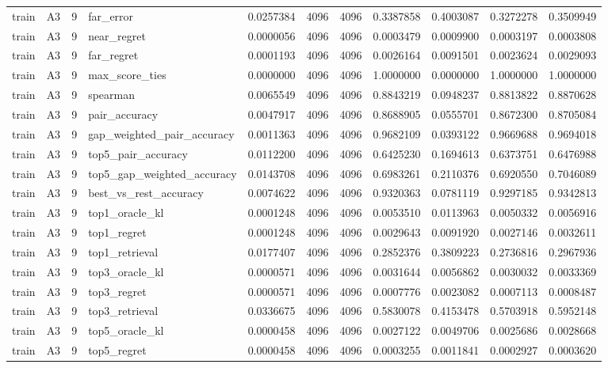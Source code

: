\begin{tabular}{llrlrrrrrrr}
train & A3 & 9 & far_error & 0.0257384 & 4096 & 4096 & 0.3387858 & 0.4003087 & 0.3272278 & 0.3509949 \\
train & A3 & 9 & near_regret & 0.0000056 & 4096 & 4096 & 0.0003479 & 0.0009900 & 0.0003197 & 0.0003808 \\
train & A3 & 9 & far_regret & 0.0001193 & 4096 & 4096 & 0.0026164 & 0.0091501 & 0.0023624 & 0.0029093 \\
train & A3 & 9 & max_score_ties & 0.0000000 & 4096 & 4096 & 1.0000000 & 0.0000000 & 1.0000000 & 1.0000000 \\
train & A3 & 9 & spearman & 0.0065549 & 4096 & 4096 & 0.8843219 & 0.0948237 & 0.8813822 & 0.8870628 \\
train & A3 & 9 & pair_accuracy & 0.0047917 & 4096 & 4096 & 0.8688905 & 0.0555701 & 0.8672300 & 0.8705084 \\
train & A3 & 9 & gap_weighted_pair_accuracy & 0.0011363 & 4096 & 4096 & 0.9682109 & 0.0393122 & 0.9669688 & 0.9694018 \\
train & A3 & 9 & top5_pair_accuracy & 0.0112200 & 4096 & 4096 & 0.6425230 & 0.1694613 & 0.6373751 & 0.6476988 \\
train & A3 & 9 & top5_gap_weighted_accuracy & 0.0143708 & 4096 & 4096 & 0.6983261 & 0.2110376 & 0.6920550 & 0.7046089 \\
train & A3 & 9 & best_vs_rest_accuracy & 0.0074622 & 4096 & 4096 & 0.9320363 & 0.0781119 & 0.9297185 & 0.9342813 \\
train & A3 & 9 & top1_oracle_kl & 0.0001248 & 4096 & 4096 & 0.0053510 & 0.0113963 & 0.0050332 & 0.0056916 \\
train & A3 & 9 & top1_regret & 0.0001248 & 4096 & 4096 & 0.0029643 & 0.0091920 & 0.0027146 & 0.0032611 \\
train & A3 & 9 & top1_retrieval & 0.0177407 & 4096 & 4096 & 0.2852376 & 0.3809223 & 0.2736816 & 0.2967936 \\
train & A3 & 9 & top3_oracle_kl & 0.0000571 & 4096 & 4096 & 0.0031644 & 0.0056862 & 0.0030032 & 0.0033369 \\
train & A3 & 9 & top3_regret & 0.0000571 & 4096 & 4096 & 0.0007776 & 0.0023082 & 0.0007113 & 0.0008487 \\
train & A3 & 9 & top3_retrieval & 0.0336675 & 4096 & 4096 & 0.5830078 & 0.4153478 & 0.5703918 & 0.5952148 \\
train & A3 & 9 & top5_oracle_kl & 0.0000458 & 4096 & 4096 & 0.0027122 & 0.0049706 & 0.0025686 & 0.0028668 \\
train & A3 & 9 & top5_regret & 0.0000458 & 4096 & 4096 & 0.0003255 & 0.0011841 & 0.0002927 & 0.0003620 \\

\end{tabular}

